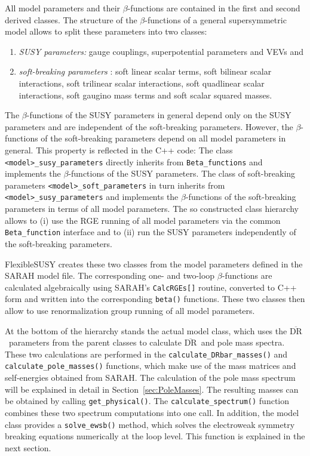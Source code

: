 \documentclass[final,3p,11pt,pdflatex]{elsarticle}
\makeatletter
\newcommand{\fs}{FlexibleSUSY\@\xspace}
\newcommand{\code}[1]{\lstinline|#1|}  %
\newcommand{\textoverline}[1]{$\overline{\mbox{#1}}$}
\newcommand{\DRbar}{\textoverline{DR}\xspace}
\newcommand{\secref}[1]{Section~\ref{#1}}
\makeatother
\begin{document}
All model parameters and their $\beta$-functions are contained in
the first and second derived classes.  The structure of the
$\beta$-functions of a general supersymmetric model
\cite{Jones:1974pg,Jones:1983vk,West:1984dg,Martin:1993yx,Yamada:1993ga,Jack:1994kd,Jack:1994rk,Yam94,MV94,Fonseca:2011vn,Goodsell:2012fm,Sperling:2013eva,Sperling:2013xqa}
allows to split these parameters into two classes:
%
\begin{enumerate}
\item \emph{SUSY parameters:} gauge couplings, superpotential
  parameters and VEVs and
\item \emph{soft-breaking parameters} \cite{Girardello:1981wz}: soft
  linear scalar terms, soft bilinear scalar interactions, soft
  trilinear scalar interactions, soft quadlinear scalar interactions,
  soft gaugino mass terms and soft
  scalar squared masses.
\end{enumerate}
%
The $\beta$-functions of the SUSY parameters in general depend only on
the SUSY parameters and are independent of the soft-breaking
parameters.  However, the $\beta$-functions of the soft-breaking
parameters depend on all model parameters in general.
%
This property is reflected in the C++ code: The class
\code{<model>_susy_parameters} directly inherits from
\code{Beta_functions} and implements the $\beta$-functions of the SUSY
parameters.  The class of soft-breaking parameters
\code{<model>_soft_parameters} in turn inherits from
\code{<model>_susy_parameters} and implements the $\beta$-functions of
the soft-breaking parameters in terms of all model parameters.  The so
constructed class hierarchy allows to (i) use the RGE running of all
model parameters via the common \code{Beta_function} interface and to
(ii) run the SUSY parameters independently of the soft-breaking
parameters.

\fs creates these two classes from the model parameters defined in the
SARAH model file.  The corresponding one- and two-loop
$\beta$-functions are calculated algebraically using SARAH's
\code{CalcRGEs[]} routine, converted to C++ form and written into the
corresponding \code{beta()} functions.  These two classes then allow
to use renormalization group running of all model parameters.

At the bottom of the hierarchy stands the actual model class, which
uses the \DRbar\ parameters from the parent classes to calculate
\DRbar\ and pole mass spectra.  These two calculations are performed
in the \code{calculate_DRbar_masses()} and
\code{calculate_pole_masses()} functions, which make use of the mass
matrices and self-energies obtained from SARAH.  The calculation of
the pole mass spectrum will be explained in detail in
\secref{sec:PoleMasses}.  The resulting masses can be obtained by
calling \code{get_physical()}.  The \code{calculate_spectrum()}
function combines these two spectrum computations into one call.  In
addition, the model class provides a \code{solve_ewsb()} method, which
solves the electroweak symmetry breaking equations numerically at the
loop level.  This function is explained in the next section.
\end{document}
